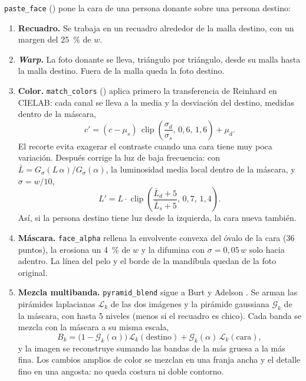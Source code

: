 \texttt{paste\_face} () pone la cara de una persona donante sobre una persona destino:
\begin{enumerate}
  \item \textbf{Recuadro.} Se trabaja en un recuadro alrededor de la malla destino, con un margen del 25~\% de $w$.
  \item \textbf{\emph{Warp}.} La foto donante se lleva, triángulo por triángulo, desde su malla hasta la malla destino. Fuera de la malla queda la foto destino.
  \item \textbf{Color.} \texttt{match\_colors} () aplica primero la transferencia de Reinhard \cite{reinhard2001} en CIELAB: cada canal se lleva a la media y la desviación del destino, medidas dentro de la máscara,
  \begin{equation}
    c'=(c-\mu_s)\,\operatorname{clip}\!\left(\frac{\sigma_d}{\sigma_s},\,0{,}6,\,1{,}6\right)+\mu_d.
  \end{equation}
  El recorte evita exagerar el contraste cuando una cara tiene muy poca variación. Después corrige la luz de baja frecuencia: con $\bar L=G_\sigma(L\,\alpha)/G_\sigma(\alpha)$, la luminosidad media local dentro de la máscara, y $\sigma=w/10$,
  \begin{equation}
    L' = L\cdot\operatorname{clip}\!\left(\frac{\bar L_d+5}{\bar L_s+5},\,0{,}7,\,1{,}4\right).
  \end{equation}
  Así, si la persona destino tiene luz desde la izquierda, la cara nueva también.
  \item \textbf{Máscara.} \texttt{face\_alpha} rellena la envolvente convexa del óvalo de la cara (36 puntos), la erosiona un 4~\% de $w$ y la difumina con $\sigma=0{,}05\,w$ solo hacia adentro. La línea del pelo y el borde de la mandíbula quedan de la foto original.
  \item \textbf{Mezcla multibanda.} \texttt{pyramid\_blend} sigue a Burt y Adelson \cite{burt1983}. Se arman las pirámides laplacianas $\mathcal L_k$ de las dos imágenes y la pirámide gaussiana $\mathcal G_k$ de la máscara, con hasta 5 niveles (menos si el recuadro es chico). Cada banda se mezcla con la máscara a su misma escala,
  \begin{equation}
    B_k=\big(1-\mathcal G_k(\alpha)\big)\,\mathcal L_k(\text{destino})+\mathcal G_k(\alpha)\,\mathcal L_k(\text{cara}),
  \end{equation}
  y la imagen se reconstruye sumando las bandas de la más gruesa a la más fina. Los cambios amplios de color se mezclan en una franja ancha y el detalle fino en una angosta: no queda costura ni doble contorno.
\end{enumerate}

